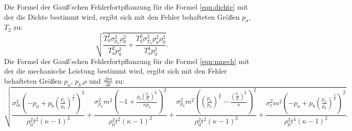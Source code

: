 Die Formel der Gauß'schen Fehlerfortpflanzung für die Formel \ref{eqn:dichte} mit der die Dichte bestimmt wird, ergibt sich mit den Fehler behafteten Größen 
$p_a$, $T_2$ zu:
\begin{equation}
\sqrt{\frac{T_{0}^{2} \sigma_{p_{a}}^{2} \rho_{0}^{2}}{T_{a}^{2} p_{0}^{2}} + \frac{T_{0}^{2} \sigma_{T_{a}}^{2} p_{a}^{2} \rho_{0}^{2}}{T_{a}^{4} p_{0}^{2}}}.
    \label{eq:dichteFehler}
\end{equation}
Die Formel der Gauß'schen Fehlerfortpflanzung für die Formel \ref{eqn:nmech} mit der die mechanische Leistung bestimmt wird, ergibt sich mit den Fehler behafteten Größen 
$p_a$, $p_b$,$\rho$ und $\frac{\Delta m}{\Delta t}$ zu:
\begin{equation}
\sqrt{\frac{\sigma_{m}^{2} \left(- p_{a} + p_{b} \left(\frac{p_{a}}{p_{b}}\right)^{\frac{1}{\kappa}}\right)^{2}}{\rho_{0}^{2} t^{2} \left(\kappa - 1\right)^{2}} + \frac{\sigma_{p_{a}}^{2} m^{2} \left(-1 + \frac{p_{b} \left(\frac{p_{a}}{p_{b}}\right)^{\frac{1}{\kappa}}}{\kappa p_{a}}\right)^{2}}{\rho_{0}^{2} t^{2} \left(\kappa - 1\right)^{2}} + \frac{\sigma_{p_{b}}^{2} m^{2} \left(\left(\frac{p_{a}}{p_{b}}\right)^{\frac{1}{\kappa}} - \frac{\left(\frac{p_{a}}{p_{b}}\right)^{\frac{1}{\kappa}}}{\kappa}\right)^{2}}{\rho_{0}^{2} t^{2} \left(\kappa - 1\right)^{2}} + \frac{\sigma_{t}^{2} m^{2} \left(- p_{a} + p_{b} \left(\frac{p_{a}}{p_{b}}\right)^{\frac{1}{\kappa}}\right)^{2}}{\rho_{0}^{2} t^{4} \left(\kappa - 1\right)^{2}}}.
    \label{eq:nmechFehler}
\end{equation}
